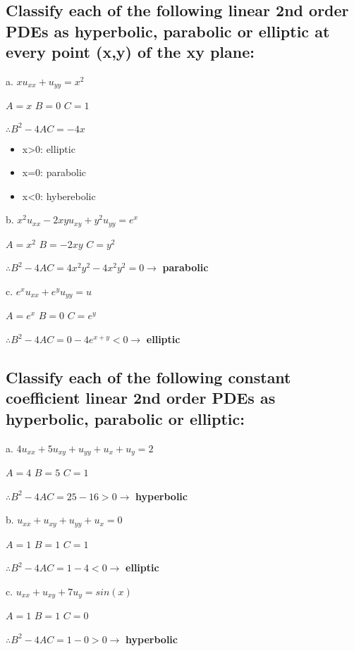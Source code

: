 \documentclass[12 pt]{article}
\begin{document}
\subsection*{Classify each of the following linear 2nd order PDEs as hyperbolic, parabolic or elliptic at
every point (x,y) of the xy plane:}
a. $ xu_{xx}+u_{yy}=x^2$
\begin{tcolorbox}
$A=x$ \hspace*{0.3cm} $B=0$ \hspace*{0.3cm} $C=1$

$\therefore B^2-4AC=-4x$
\begin{itemize}
    \item x>0: elliptic
    \item x=0: parabolic
    \item x<0: hyberebolic
\end{itemize}
\end{tcolorbox}
\newpage
b. $ x^2u_{xx}-2xyu_{xy}+y^2u_{yy}=e^x$
\begin{tcolorbox}
$A=x^2$ \hspace*{0.3cm} $B=-2xy$ \hspace*{0.3cm} $C=y^2$

$\therefore B^2-4AC=4x^2y^2-4x^2y^2=0\xrightarrow{}$ \textbf{parabolic}
\end{tcolorbox}
c. $ e^xu_{xx}+e^yu_{yy}=u$
\begin{tcolorbox}
$A=e^x$ \hspace*{0.3cm} $B=0$ \hspace*{0.3cm} $C=e^y$

$\therefore B^2-4AC=0-4e^{x+y}<0\xrightarrow{}$ \textbf{elliptic}
\end{tcolorbox}
\subsection*{Classify each of the following constant coefficient linear 2nd order PDEs as hyperbolic,
parabolic or elliptic:}
a. $ 4u_{xx}+5u_{xy}+u_{yy}+u_{x}+u_{y}=2$
\begin{tcolorbox}
$A=4$ \hspace*{0.3cm} $B=5$ \hspace*{0.3cm} $C=1$

$\therefore B^2-4AC=25-16>0\xrightarrow{}$ \textbf{hyperbolic}
\end{tcolorbox}
b. $ u_{xx}+u_{xy}+u_{yy}+u_{x}=0$
\begin{tcolorbox}
$A=1$ \hspace*{0.3cm} $B=1$ \hspace*{0.3cm} $C=1$

$\therefore B^2-4AC=1-4<0\xrightarrow{}$ \textbf{elliptic}
\end{tcolorbox}
c. $ u_{xx}+u_{xy}+7u_{y}=sin(x)$
\begin{tcolorbox}
$A=1$ \hspace*{0.3cm} $B=1$ \hspace*{0.3cm} $C=0$

$\therefore B^2-4AC=1-0>0\xrightarrow{}$ \textbf{hyperbolic}
\end{tcolorbox}
\end{document}
